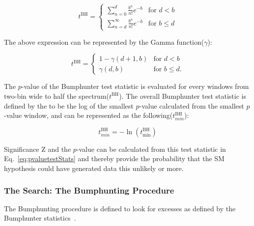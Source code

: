 \begin{equation}
    t^{\textrm{BH}}=
    \begin{cases} \sum_{n=0}^{d} \frac{b^{n}}{n!} e^{-b} &  \textrm{for $d < b$}
    \\
    \sum_{n=d}^{\infty} \frac{b^n}{n!} e^{-b} &  \textrm{for $b \leq d$}
    \end{cases}
\end{equation}

    The above expression can be represented by the Gamma function($\gamma$): 

\begin{equation}
    t^{\textrm{BH}}=
    \begin{cases} 1-\gamma(d+1, b) &  \textrm{for $d < b$}
    \\
    \gamma(d,b) &  \textrm{for $b \leq d$}.
    \end{cases}
\end{equation}
    

    The $p$-value of the Bumphunter test statistic is evaluated for every windows from two-bin wide to half the spectrum($t^{\textrm{BH}}$). The overall Bumphunter test statistic is defined by the to be the log of the smallest $p$-value calculated from the smallest $p$-value window, and can be represented as the following($t_{min}^{\textrm{BH}}$):

    \begin{equation}
        t_{min}^{\textrm{BH}} = - \ln(t^{\textrm{BH}}_{\textrm{min}}) 
    \end{equation}

    Significance Z and the $p$-value can be calculated from this test statistic in Eq.~\ref{eq:pvaluetestStats} and thereby provide the probability that the SM hypothesis could have generated data this unlikely or more. %


    \subsubsection{The Search: The Bumphunting Procedure}
    The Bumphunting procedure is defined to look for excesses as defined by the Bumphunter statistics~\cite{Pachal:2063032}.

